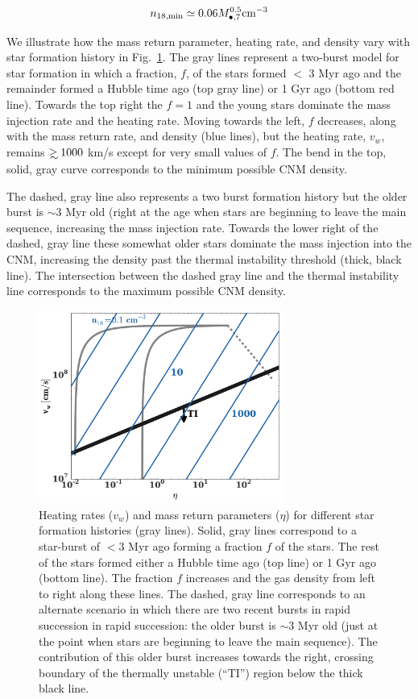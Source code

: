 \documentclass[usenatbib,fleqn]{mn2e}
\newcommand\gsim{\mathrel{\rlap{\lower4pt\hbox{\hskip1pt$\sim$}}
    \raise1pt\hbox{$>$}}}
\newcommand{\Mbh}[1][]{M_{\bullet#1}}
\begin{document}
\begin{equation}
n_{\rm 18,min}\simeq 0.06 \Mbh[,7]^{0.5} {\rm cm^{-3}}
\label{eq:n18min}
\end{equation}

We illustrate how the mass return parameter, heating rate, and
density vary with star formation history in Fig.~\ref{fig:param}. The
gray lines represent a two-burst model for star formation in which a
fraction, $f$, of the stars formed $<$ 3 Myr ago and the remainder
formed a Hubble time ago (top gray line) or 1 Gyr ago (bottom red
line).  Towards the top right the $f=1$ and the young stars dominate
the mass injection rate and the heating rate.  Moving towards the
left, $f$ decreases, along with the mass return rate, and density
(blue lines), but the heating rate, $v_w$, remains $\gsim 1000$ km/s
except for very small values of $f$. The bend in the top, solid, gray curve
corresponds to the minimum possible CNM density.

The dashed, gray line also represents a two burst formation history
but the older burst is $\sim 3$ Myr old (right at the age when stars
are beginning to leave the main sequence, increasing the mass
injection rate. Towards the lower right of the dashed, gray line these
somewhat older stars dominate the mass injection into the CNM,
increasing the density past the thermal instability threshold (thick,
black line). The intersection between the dashed gray line and the
thermal instability line corresponds to the maximum possible CNM
density.

\begin{figure} 
  \includegraphics[width=8cm]{cnm_plot.pdf}
  \caption{\label{fig:param} Heating rates ($v_w$) and mass return
    parameters ($\eta$) for different star formation histories (gray
    lines). Solid, gray lines correspond to a star-burst of $<3$ Myr
    ago forming a fraction $f$ of the stars. The rest of the stars
    formed either a Hubble time ago (top line) or 1 Gyr ago (bottom
    line). The fraction $f$ increases and the gas density from left to
    right along these lines. The dashed, gray line corresponds to an
    alternate scenario in which there are two recent bursts in rapid
    succession in rapid succession: the older burst is $\sim 3$ Myr
    old (just at the point when stars are beginning to leave the main
    sequence). The contribution of this older burst increases towards
    the right, crossing boundary of the thermally unstable (``TI'')
    region below the thick black line.}
\end{figure}
\end{document}
